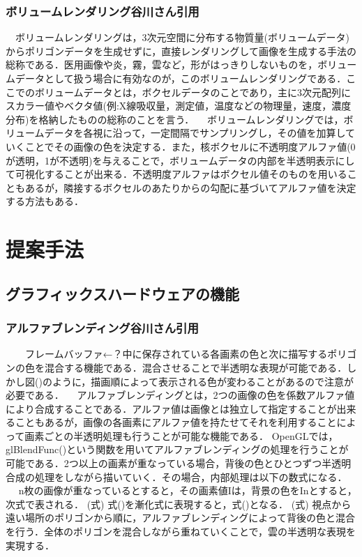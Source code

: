 \documentclass[11pt]{jreport}
\begin{document}
\subsection{ボリュームレンダリング谷川さん引用}
　ボリュームレンダリングは，3次元空間に分布する物質量(ボリュームデータ)からポリゴンデータを生成せずに，直接レンダリングして画像を生成する手法の総称である．医用画像や炎，霧，雲など，形がはっきりしないものを，ボリュームデータとして扱う場合に有効なのが，このボリュームレンダリングである．ここでのボリュームデータとは，ボクセルデータのことであり，主に3次元配列にスカラー値やベクタ値(例:X線吸収量，測定値，温度などの物理量，速度，濃度分布)を格納したものの総称のことを言う．
　ボリュームレンダリングでは，ボリュームデータを各視に沿って，一定間隔でサンプリングし，その値を加算していくことでその画像の色を決定する．また，核ボクセルに不透明度アルファ値(0が透明，1が不透明)を与えることで，ボリュームデータの内部を半透明表示にして可視化することが出来る．不透明度アルファはボクセル値そのものを用いることもあるが，隣接するボクセルのあたりからの勾配に基づいてアルファ値を決定する方法もある．

\chapter{提案手法}

\section{グラフィックスハードウェアの機能}
\subsection{アルファブレンディング谷川さん引用}
　　フレームバッファ←？中に保存されている各画素の色と次に描写するポリゴンの色を混合する機能である．混合させることで半透明な表現が可能である．しかし図()のように，描画順によって表示される色が変わることがあるので注意が必要である．
　アルファブレンディングとは，2つの画像の色を係数アルファ値により合成することである．アルファ値は画像とは独立して指定することが出来ることもあるが，画像の各画素にアルファ値を持たせてそれを利用することによって画素ごとの半透明処理も行うことが可能な機能である．
 OpenGLでは，glBlendFunc()という関数を用いてアルファブレンディングの処理を行うことが可能である．2つ以上の画素が重なっている場合，背後の色とひとつずつ半透明合成の処理をしながら描いていく．その場合，内部処理は以下の数式になる．
　 n枚の画像が重なっているとすると，その画素値Iは，背景の色をInとすると，次式で表される．
(式)
式()を漸化式に表現すると，式()となる．
(式)
視点から遠い場所のポリゴンから順に，アルファブレンディングによって背後の色と混合を行う．全体のポリゴンを混合しながら重ねていくことで，雲の半透明な表現を実現する．
\end{document}
